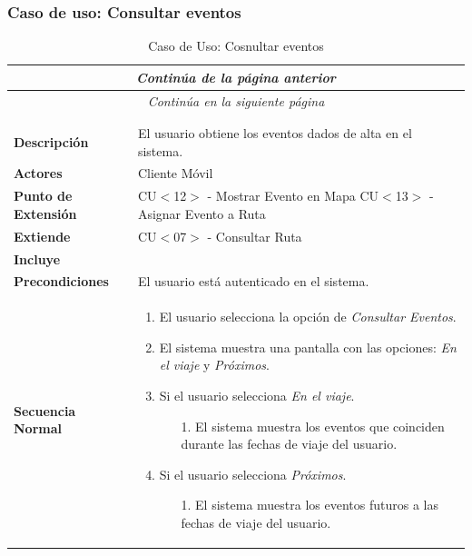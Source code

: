 \newpage
\subsubsection*{Caso de uso: Consultar eventos}
\begin{longtable}{| p{4cm} | p{10cm} |}
\endfirsthead
\multicolumn{2}{c}{\textit{Continúa de la página anterior}}\\[12pt]
\hline
\endhead
\hline
\multicolumn{2}{c}{\textit{Continúa en la siguiente página}} \\
\endfoot
\hline
\caption{Caso de Uso: Cosnultar eventos}\label{fig:1}\\
\endlastfoot


\hline
\multicolumn{2}{|c|}{\textbf{CU$<$11$>$ - Consultar Eventos}} \\

\hline
\textbf{Descripción} &
El usuario obtiene los eventos dados de alta en el sistema.\\

\hline
\textbf{Actores} &
Cliente Móvil\\

\hline
\textbf{Punto de Extensión} &
CU$<$12$>$ - Mostrar Evento en Mapa
CU$<$13$>$ - Asignar Evento a Ruta
\\

\hline
\textbf{Extiende} &
CU$<$07$>$ - Consultar Ruta
\\

\hline
\textbf{Incluye} &
\\

\hline
\textbf{Precondiciones} &
El usuario está autenticado en el sistema.\\

\hline
\textbf{Secuencia Normal} &\mbox{}\par\vspace{-\baselineskip}
\begin{enumerate}[leftmargin=0.7cm, topsep=0.1cm]
\item El usuario selecciona la opción de \textit{Consultar Eventos}.
\item El sistema muestra una pantalla con las opciones: \textit{En el viaje} y \textit{Próximos}.
\item Si el usuario selecciona \textit{En el viaje}.
	\begin{itemize}
	\item[1.] El sistema muestra los eventos que coinciden durante las fechas de viaje del usuario.
	\end{itemize}
\item Si el usuario selecciona \textit{Próximos}.
	\begin{itemize}
	\item[1.] El sistema muestra los eventos futuros a las fechas de viaje del usuario.
	\end{itemize}
\end{enumerate}\\


\end{longtable}
